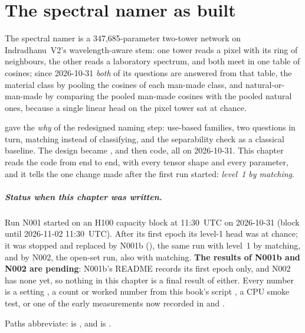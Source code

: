 \chapter{The spectral namer as built}\label{ch:namer}

\begin{onething}
The spectral namer is a 347,685-parameter two-tower network on Indradhanu~V2's wavelength-aware stem: one tower reads
a pixel with its ring of neighbours, the other reads a laboratory spectrum, and both meet in one table of cosines;
since 2026-10-31 \emph{both} of its questions are answered from that table, the material class by pooling the
cosines of each man-made class, and natural-or-man-made by comparing the pooled man-made cosines with the pooled
natural ones, because a single linear head on the pixel tower sat at chance.
\end{onething}

 gave the \emph{why} of the redesigned naming step: use-based families, two questions
in turn, matching instead of classifying, and the separability check as a classical baseline. The design became
, and then code, all on 2026-10-31. This chapter reads the code from end to
end, with every tensor shape and every parameter, and it tells the one change made after the first run started:
\emph{level~1 by matching}.

\paragraph{Status when this chapter was written.} Run N001 started on an H100 capacity block at 11:30~UTC on
2026-10-31 (block until 2026-11-02 11:30~UTC). After its first epoch its level-1 head was at chance; it was stopped
and replaced by N001b (), the same run with level~1 by matching, and by N002, the
open-set run, also with matching. \textbf{The results of N001b and N002 are pending}: N001b's README records its
first epoch only, and N002 has none yet, so nothing in this chapter is a final result of either. Every number is a
setting , a count or worked number from this book's script
 \tagC, a CPU smoke test, or one of the early measurements now
recorded in  and .

Paths abbreviate:  is , and  is
.

